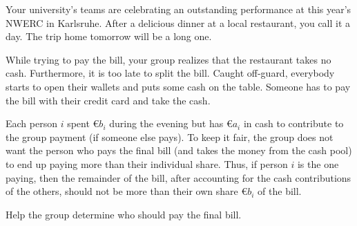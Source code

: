





Your university's teams are celebrating an outstanding performance at this year's NWERC in Karlsruhe.
After a delicious dinner at a local restaurant, you call it a day.
The trip home tomorrow will be a long one.

While trying to pay the bill, your group realizes that the restaurant takes no cash.
Furthermore, it is too late to split the bill.
Caught off-guard, everybody starts to open their wallets and puts some cash on the table.
Someone has to pay the bill with their credit card and take the cash.

Each person $i$ spent €$b_i$ during the evening but has €$a_i$ in cash to contribute to the group payment (if someone else pays).
To keep it fair, the group does not want the person who pays the final bill (and takes the money from the cash pool) to end up paying more than their individual share.
Thus, if person $i$ is the one paying, then the remainder of the bill, after
accounting for the cash contributions of the others, should not be more than their own share €$b_i$ of the bill.

Help the group determine who should pay the final bill.




